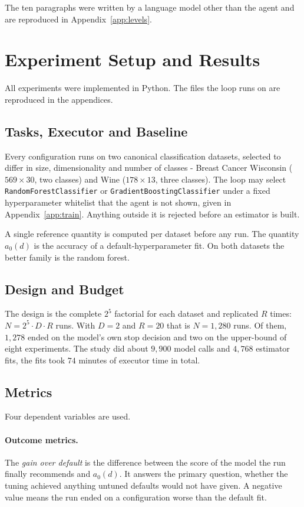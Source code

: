 \documentclass[11pt]{article}
\begin{document}
The ten paragraphs were written by a language model other than the agent and are reproduced in Appendix~\ref{app:levels}.

\section{Experiment Setup and Results}
\label{sec:eval}

All experiments were implemented in Python. The files the loop runs on are reproduced in the appendices.

\subsection{Tasks, Executor and Baseline}

Every configuration runs on two canonical classification datasets, selected to differ in size, dimensionality and number of classes - Breast Cancer Wisconsin ($569 \times 30$, two classes) and Wine ($178 \times 13$, three classes). The loop may select \texttt{RandomForestClassifier} or \texttt{GradientBoostingClassifier} under a fixed hyperparameter whitelist that the agent is not shown, given in Appendix~\ref{app:train}. Anything outside it is rejected before an estimator is built.

A single reference quantity is computed per dataset before any run. The quantity $a_0(d)$ is the accuracy of a default-hyperparameter fit. On both datasets the better family is the random forest.
\subsection{Design and Budget}

The design is the complete $2^5$ factorial for each dataset and replicated $R$ times: $N = 2^5 \cdot D \cdot R$ runs. With $D=2$ and $R=20$ that is $N=1{,}280$ runs. Of them, $1{,}278$ ended on the model's own stop decision and two on the upper-bound of eight experiments. The study did about $9{,}900$ model calls and $4{,}768$ estimator fits, the fits took $74$ minutes of executor time in total.

\subsection{Metrics}

Four dependent variables are used.

\paragraph{Outcome metrics.} The \emph{gain over default} is the difference between the score of the model the run finally recommends and $a_0(d)$. It answers the primary question, whether the tuning achieved anything untuned defaults would not have given. A negative value means the run ended on a configuration worse than the default fit.
\end{document}
